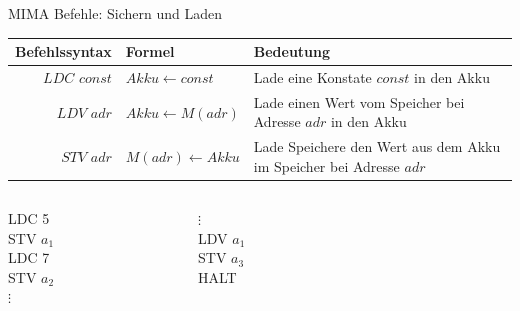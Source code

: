 \begin{frame}{MIMA Befehle: Sichern und Laden}
	\begin{tabular}{r | l p{5cm} }
		Befehlssyntax & Formel & Bedeutung\\\hline\hline 
		$LDC$ $const$ & $Akku \leftarrow const$ & Lade eine Konstate $const$ in den Akku \\\hline 
		$LDV$ $adr$ & $Akku \leftarrow M(adr)$ & Lade einen Wert vom Speicher bei Adresse $adr$ in den Akku\\\hline
		$STV$ $adr$ & $M(adr) \leftarrow Akku$ & Lade Speichere den Wert aus dem Akku im Speicher bei Adresse $adr$\\\hline
	\end{tabular}

	\bp 
	\vspace{.5cm}
	\vspace{.2cm}
	
	\begin{columns}
		\begin{column}{0.25\textwidth}
			LDC 5 \\ STV $a_1$ \\ LDC 7 \\ STV $a_2$ \\ $\vdots$
		\end{column}
		\begin{column}{0.25\textwidth}
			 $\vdots$ \\ LDV $a_1$ \\ STV $a_3$ \\ HALT
		\end{column}
		
		\begin{column}{0.5\textwidth}
			\begin{memory}
			\end{memory}
		\end{column}
	\end{columns}

\end{frame}

